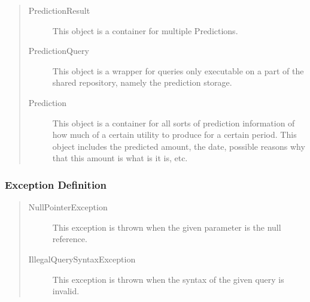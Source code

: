 \begin{quote}
	\begin{description}
		\item[PredictionResult] This object is a container for multiple Predictions.
		\item[PredictionQuery] This object is a wrapper for queries only executable on
		a part of the shared repository, namely the prediction storage.
		\item[Prediction] This object is a container for all sorts of
		prediction information of how much of a certain utility to produce for
		a certain period. This object includes the predicted amount, the date,
		possible reasons why that this amount is what is it is, etc.
	\end{description} 
\end{quote}

\subsubsection{Exception Definition} 

\begin{quote}
	\begin{description}
		\item[NullPointerException] This exception is thrown when the given parameter
		is the null reference.
		\item[IllegalQuerySyntaxException] This exception is thrown when the syntax of
		the given query is invalid.
	\end{description} 
\end{quote}